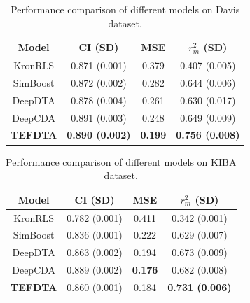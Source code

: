 \documentclass{article}
\begin{document}
\begin{table}[ht]
	\centering
	\caption{Performance comparison of different models on Davis dataset.}
	\label{tab:comparison_davis}
	\begin{tabular}{cccc}
		\toprule
		\textbf{Model} & \textbf{CI (SD)} & \textbf{MSE} & \textbf{$r_m^2$ (SD)} \\
		\midrule
		KronRLS   & 0.871 (0.001) & 0.379 & 0.407 (0.005) \\
		SimBoost  & 0.872 (0.002) & 0.282 & 0.644 (0.006) \\
		DeepDTA   & 0.878 (0.004) & 0.261 & 0.630 (0.017) \\
		DeepCDA   & 0.891 (0.003) & 0.248 & 0.649 (0.009) \\
		\textbf{TEFDTA} & \textbf{0.890 (0.002)} & \textbf{0.199} & \textbf{0.756 (0.008)} \\
		\bottomrule
	\end{tabular}
\end{table}

\begin{table}[ht]
	\centering
	\caption{Performance comparison of different models on KIBA dataset.}
	\label{tab:comparison_kiba}
	\begin{tabular}{cccc}
		\toprule
		\textbf{Model} & \textbf{CI (SD)} & \textbf{MSE} & \textbf{$r_m^2$ (SD)} \\
		\midrule
		KronRLS   & 0.782 (0.001) & 0.411 & 0.342 (0.001) \\
		SimBoost  & 0.836 (0.001) & 0.222 & 0.629 (0.007) \\
		DeepDTA   & 0.863 (0.002) & 0.194 & 0.673 (0.009) \\
		DeepCDA   & 0.889 (0.002) & \textbf{0.176} & 0.682 (0.008) \\
		\textbf{TEFDTA} & 0.860 (0.001) & 0.184 & \textbf{0.731 (0.006)} \\
		\bottomrule
	\end{tabular}
\end{table}

\end{document}
